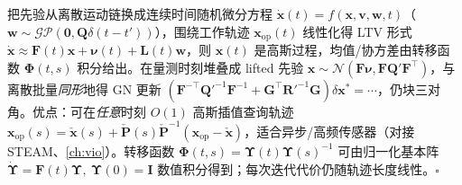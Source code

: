 \begin{derivation}
把先验从离散运动链换成连续时间随机微分方程 $\dot{\mathbf{x}}(t)=f(\mathbf{x},\mathbf{v},\mathbf{w},t)$（$\mathbf{w}\sim\mathcal{GP}(\mathbf{0},\mathbf{Q}\delta(t-t'))$），围绕工作轨迹 $\mathbf{x}_{\mathrm{op}}(t)$ 线性化得 LTV 形式 $\dot{\mathbf{x}}\approx\mathbf{F}(t)\mathbf{x}+\boldsymbol{\nu}(t)+\mathbf{L}(t)\mathbf{w}$，则 $\mathbf{x}(t)$ 是高斯过程，均值/协方差由转移函数 $\boldsymbol{\Phi}(t,s)$ 积分给出。在量测时刻堆叠成 lifted 先验 $\mathbf{x}\sim\mathcal{N}(\mathbf{F}\boldsymbol{\nu},\mathbf{F}\mathbf{Q}'\mathbf{F}^\top)$，与离散批量\emph{同形}地得 GN 更新 $(\mathbf{F}^{-\top}\mathbf{Q}'^{-1}\mathbf{F}^{-1}+\mathbf{G}^\top\mathbf{R}'^{-1}\mathbf{G})\delta\mathbf{x}^*=\cdots$，仍块三对角。优点：可在\emph{任意}时刻 $O(1)$ 高斯插值查询轨迹 $\mathbf{x}_{\mathrm{op}}(s)=\check{\mathbf{x}}(s)+\check{\mathbf{P}}(s)\check{\mathbf{P}}^{-1}(\mathbf{x}_{\mathrm{op}}-\check{\mathbf{x}})$，适合异步/高频传感器（对接 STEAM、\cref{ch:vio}）。转移函数 $\boldsymbol{\Phi}(t,s)=\boldsymbol{\Upsilon}(t)\boldsymbol{\Upsilon}(s)^{-1}$ 可由归一化基本阵 $\dot{\boldsymbol{\Upsilon}}=\mathbf{F}(t)\boldsymbol{\Upsilon},\ \boldsymbol{\Upsilon}(0)=\mathbf{I}$ 数值积分得到；每次迭代代价仍随轨迹长度线性\cite{barfoot2024state}。\hfill$\square$
\end{derivation}
